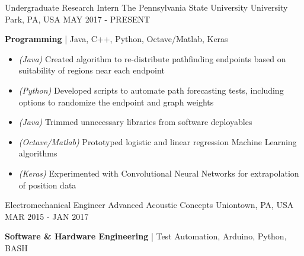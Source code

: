 
\begin{cventries}
	\cventry
	{Undergraduate Research Intern} %
	{The Pennsylvania State University} %
	{University Park, PA, USA} %
	{MAY 2017 - PRESENT} %
	{
		\begin{cvitems} %
			\item {\textbf{Programming} | {\color{awesome}Java, C++, Python, Octave/Matlab, Keras}
				\begin{itemize}[noitemsep,wide=0pt, leftmargin=\dimexpr{} + 2\relax]
					\item[\textbullet]{\textit{(Java)} Created algorithm to re-distribute pathfinding endpoints based on suitability of regions near each endpoint}
					\item[\textbullet]{\textit{(Python)} Developed scripts to automate path forecasting tests, including options to randomize the endpoint and graph weights}
					\item[\textbullet]{\textit{(Java)} Trimmed unnecessary libraries from software deployables}
					\item[\textbullet]{\textit{(Octave/Matlab)} Prototyped logistic and linear regression Machine Learning algorithms}
					\item[\textbullet]{\textit{(Keras)} Experimented with Convolutional Neural Networks for extrapolation of position data}
				\end{itemize}}
		\end{cvitems}
	}
	\cventry
	{Electromechanical Engineer} %
	{Advanced Acoustic Concepts} %
	{Uniontown, PA, USA} %
	{MAR 2015 - JAN 2017} %
	{
		\begin{cvitems} %
			\item {\textbf{Software \& Hardware Engineering} | {\color{awesome}Test Automation, Arduino, Python, BASH}
				\begin{itemize}[noitemsep,wide=0pt, leftmargin=\dimexpr{} + 2\relax]

\end{itemize}}
\end{cvitems}}
\end{cventries}
